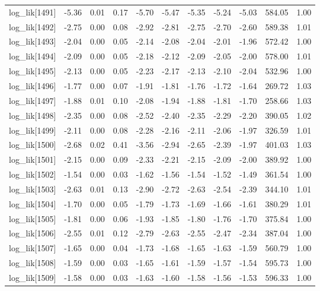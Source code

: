 \begin{table}[ht]
\begin{tabular}{rrrrrrrrrrr}
  log\_lik[1491] & -5.36 & 0.01 & 0.17 & -5.70 & -5.47 & -5.35 & -5.24 & -5.03 & 584.05 & 1.00 \\ 
  log\_lik[1492] & -2.75 & 0.00 & 0.08 & -2.92 & -2.81 & -2.75 & -2.70 & -2.60 & 589.38 & 1.01 \\ 
  log\_lik[1493] & -2.04 & 0.00 & 0.05 & -2.14 & -2.08 & -2.04 & -2.01 & -1.96 & 572.42 & 1.00 \\ 
  log\_lik[1494] & -2.09 & 0.00 & 0.05 & -2.18 & -2.12 & -2.09 & -2.05 & -2.00 & 578.00 & 1.01 \\ 
  log\_lik[1495] & -2.13 & 0.00 & 0.05 & -2.23 & -2.17 & -2.13 & -2.10 & -2.04 & 532.96 & 1.00 \\ 
  log\_lik[1496] & -1.77 & 0.00 & 0.07 & -1.91 & -1.81 & -1.76 & -1.72 & -1.64 & 269.72 & 1.03 \\ 
  log\_lik[1497] & -1.88 & 0.01 & 0.10 & -2.08 & -1.94 & -1.88 & -1.81 & -1.70 & 258.66 & 1.03 \\ 
  log\_lik[1498] & -2.35 & 0.00 & 0.08 & -2.52 & -2.40 & -2.35 & -2.29 & -2.20 & 390.05 & 1.02 \\ 
  log\_lik[1499] & -2.11 & 0.00 & 0.08 & -2.28 & -2.16 & -2.11 & -2.06 & -1.97 & 326.59 & 1.01 \\ 
  log\_lik[1500] & -2.68 & 0.02 & 0.41 & -3.56 & -2.94 & -2.65 & -2.39 & -1.97 & 401.03 & 1.03 \\ 
  log\_lik[1501] & -2.15 & 0.00 & 0.09 & -2.33 & -2.21 & -2.15 & -2.09 & -2.00 & 389.92 & 1.00 \\ 
  log\_lik[1502] & -1.54 & 0.00 & 0.03 & -1.62 & -1.56 & -1.54 & -1.52 & -1.49 & 361.54 & 1.00 \\ 
  log\_lik[1503] & -2.63 & 0.01 & 0.13 & -2.90 & -2.72 & -2.63 & -2.54 & -2.39 & 344.10 & 1.01 \\ 
  log\_lik[1504] & -1.70 & 0.00 & 0.05 & -1.79 & -1.73 & -1.69 & -1.66 & -1.61 & 380.29 & 1.01 \\ 
  log\_lik[1505] & -1.81 & 0.00 & 0.06 & -1.93 & -1.85 & -1.80 & -1.76 & -1.70 & 375.84 & 1.00 \\ 
  log\_lik[1506] & -2.55 & 0.01 & 0.12 & -2.79 & -2.63 & -2.55 & -2.47 & -2.34 & 387.04 & 1.00 \\ 
  log\_lik[1507] & -1.65 & 0.00 & 0.04 & -1.73 & -1.68 & -1.65 & -1.63 & -1.59 & 560.79 & 1.00 \\ 
  log\_lik[1508] & -1.59 & 0.00 & 0.03 & -1.65 & -1.61 & -1.59 & -1.57 & -1.54 & 595.73 & 1.00 \\ 
  log\_lik[1509] & -1.58 & 0.00 & 0.03 & -1.63 & -1.60 & -1.58 & -1.56 & -1.53 & 596.33 & 1.00 \\ 

\end{tabular}
\end{table}
